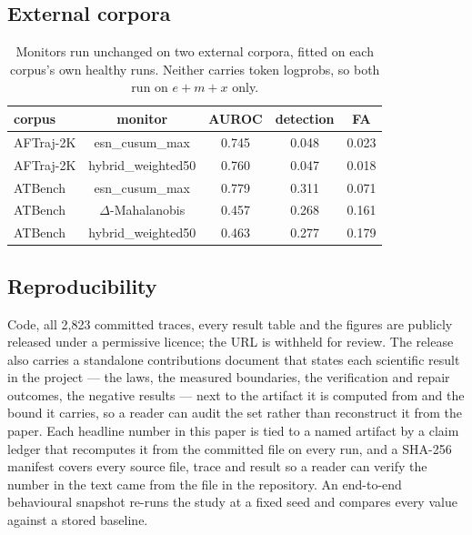 \documentclass{article}
\begin{document}
\subsection{External corpora}

\begin{table}[h]
\centering
\small
\begin{tabular}{lcccc}
\toprule
corpus & monitor & AUROC & detection & FA \\
\midrule
AFTraj-2K & esn\_cusum\_max & 0.745 & 0.048 & 0.023 \\
AFTraj-2K & hybrid\_weighted50 & 0.760 & 0.047 & 0.018 \\
ATBench   & esn\_cusum\_max & 0.779 & 0.311 & 0.071 \\
ATBench   & $\Delta$-Mahalanobis & 0.457 & 0.268 & 0.161 \\
ATBench   & hybrid\_weighted50 & 0.463 & 0.277 & 0.179 \\
\bottomrule
\end{tabular}
\caption{Monitors run unchanged on two external corpora, fitted on each
corpus's own healthy runs. Neither carries token logprobs, so both run on
$e{+}m{+}x$ only.}
\end{table}

\subsection{Reproducibility}

Code, all 2{,}823 committed traces, every result table and the figures are
publicly released under a permissive licence; the URL is withheld for review.
The release also carries a standalone contributions document that states each
scientific result in the project --- the laws, the measured boundaries, the
verification and repair outcomes, the negative results --- next to the artifact
it is computed from and the bound it carries, so a reader can audit the set
rather than reconstruct it from the paper.
Each headline number in this paper is tied to a named artifact by a claim
ledger that recomputes it from the committed file on every run, and a SHA-256
manifest covers every source file, trace and result so a reader can verify the
number in the text came from the file in the repository. An end-to-end
behavioural snapshot re-runs the study at a fixed seed and compares every value
against a stored baseline.
\end{document}
